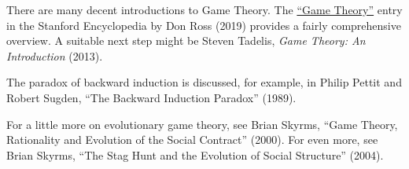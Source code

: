 \begin{sources}

  There are many decent introductions to Game Theory. The
  \href{https://plato.stanford.edu/entries/game-theory/}{``Game Theory''} entry
  in the Stanford Encyclopedia by Don Ross (2019) provides a fairly
  comprehensive overview. A suitable next step might be Steven Tadelis,
  \emph{Game Theory: An Introduction} (2013).

  The paradox of backward induction is discussed, for example, in Philip Pettit
  and Robert Sugden, ``The Backward Induction Paradox'' (1989).

  For a little more on evolutionary game theory, see Brian Skyrms, ``Game
  Theory, Rationality and Evolution of the Social Contract'' (2000). For even
  more, see Brian Skyrms, ``The Stag Hunt and the Evolution of Social
  Structure'' (2004).
  
\end{sources}



